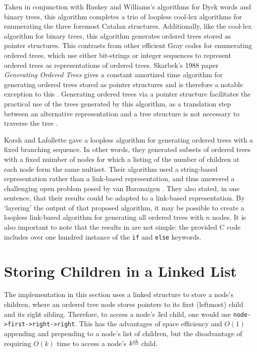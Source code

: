 Taken in conjunction with Ruskey and Williams's algorithms for Dyck words and binary trees, this algorithm completes a trio of loopless cool-lex algorithms for enumerating the three foremost Catalan structures.  
Additionally, like the cool-lex algorithm for binary trees, this algorithm generates ordered trees stored as pointer structures.  This contrasts from other efficient Gray codes for enumerating ordered trees, which use either bit-strings or integer sequences to represent ordered trees \cite{parque2021efficient} \cite{zaks1980lexotrees} \cite{er1985lexotrees} as representations of ordered trees.  Skarbek's 1988 paper \emph{Generating Ordered Trees} gives a constant amortized time algorithm for generating ordered trees stored as pointer structures and is therefore a notable exception to this \cite{skarbek1988pointerotrees}.  Generating ordered trees via a pointer structure facilitates the practical %
use of the trees generated by this algorithm, as a translation step between an alternative representation and a tree structure is not necessary to traverse the tree .

Korsh and Lafollette \cite{korsh2000multiset} gave a loopless algorithm for generating ordered trees with a fixed branching sequence.  In other words, they generated subsets of ordered trees with a fixed nuimber of nodes for which a listing of the number of children at each node form the same nultiset.  Their algorithm used a string-based representation rather than a link-based representation, and thus answered a challenging open problem posed by van Baronaigen \cite{van1991loopless}.   They also stated, in one sentence, that their results could be adapted to a link-based representation.  By `layering' the output of that proposed algorithm, it may be possible to create a loopless link-based algorithm for generating all ordered trees with $n$ nodes.  It is also important to note that the results in \cite{korsh2000multiset} are not simple: the provided C code includes over one hundred instance of the \verb$if$ and \verb$else$ keywords.



\section{Storing Children in a Linked List}\label{sec:otree-link}

The implementation in this section uses a linked structure to store a node's children, where an ordered tree node stores pointers to its first (leftmost) child and its right sibling.  Therefore, to access a node's 3rd child, one would use \verb+node->first->right->right+.
This has the advantages of space efficiency and $O(1)$ appending and prepending to a node's list of children, but the disadvantage of requiring $O(k)$ time to access a node's $k^{\underline{th}}$ child. 

